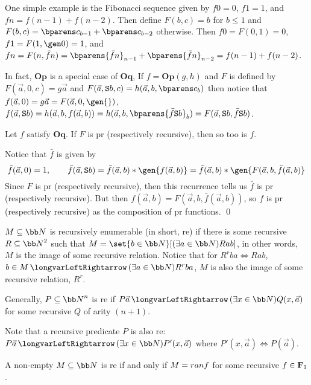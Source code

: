 One simple example is the Fibonacci sequence given by $f0=0$, $f1=1$, and $fn=f(n-1)+f(n-2)$.
Then define $F(b,c)=b$ for $b\leq1$ and $F(b,c)=\bparens c_{b-1}+\bparens c_{b-2}$ otherwise.
Then $f0=F(0,1)=0$, $f1=F(1,\gen0)=1$, and $fn=F(n,\bar fn)=\bparens{\bar fn}_{n-1}+\bparens{\bar fn}_{n-2}=f(n-1)+f(n-2)$.

In fact, $\boldsymbol{Op}$ is a special case of $\boldsymbol{Oq}$,
If $f=\boldsymbol{Op}(g,h)$ and $F$ is defined by $F(\vec a,0,c)=g\vec a$ and $F(\vec a,{\tt S}b,c)=h(\vec a,b,\bparens c_b)$ then notice that $f(\vec a,0)=g\vec a=F(\vec a,0,\gen{})$,
$f(\vec a,{\tt S}b)=h(\vec a,b,f(\vec a,b))=h(\vec a,b,\bparens{\bar f{\tt S}b}_b)=F(\vec a,{\tt S}b,\bar f{\tt S}b)$.

\bthrm

    Let $f$ satisfy $\boldsymbol{Oq}$.
    If $F$ is pr (respectively recursive), then so too is $f$.

\ethrm

Notice that $\bar f$ is given by
$$ \bar f(\vec a,0) = 1,\qquad \bar f(\vec a,{\tt S}b)=\bar f(\vec a,b) * \gen{f(\vec a,b)} = \bar f(\vec a,b) * \gen{F(\vec a,b,\bar f(\vec a,b)} $$
Since $F$ is pr (respectively recursive), then this recurrence tells us $\bar f$ is pr (respectively recursive).
But then $f(\vec a,b)=F(\vec a,b,\bar f(\vec a,b))$, so $f$ is pr (respectively recursive) as the composition of pr functions.
\qed

\bdefn

    $M\subseteq{\bb N}$ is {\emphcolor recursively enumerable} (in short, re) if there is some recursive $R\subseteq{\bb N}^2$ such that
    $M=\set{b\in{\bb N}}[(\exists a\in{\bb N})Rab]$, in other words, $M$ is the image of some recursive relation.
    Notice that for $R^rba\iff Rab$, $b\in M\iff(\exists a\in{\bb N})R^rba$, $M$ is also the image of some recursive relation, $R^r$.

    Generally, $P\subseteq{\bb N}^n$ is re if $P\vec a\iff(\exists x\in{\bb N})Q(x,\vec a)$ for some recursive $Q$ of arity $(n+1)$.

\edefn

Note that a recursive predicate $P$ is also re: $P\vec a\iff(\exists x\in{\bb N})P'(x,\vec a)$ where $P'(x,\vec a)\iff P(\vec a)$.

\bprop

    A non-empty $M\subseteq{\bb N}$ is re if and only if $M={\sl ran}f$ for some recursive $f\in{\bf F}_1$.

\eprop

